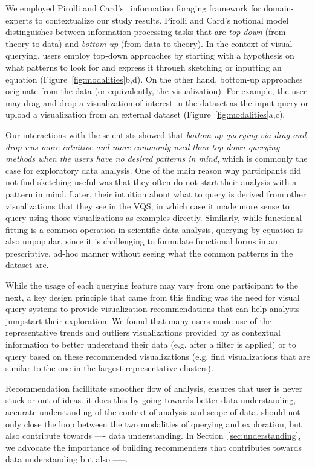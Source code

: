 We employed Pirolli and Card's~\cite{Pirolli} information foraging framework for domain-experts to contextualize our study results. Pirolli and Card's notional model distinguishes between information processing tasks that are \textit{top-down} (from theory to data) and \textit{bottom-up} (from data to theory). In the context of visual querying, users employ top-down approaches by starting with a hypothesis on what patterns to look for and express it through sketching or inputting an equation (Figure~\ref{fig:modalities}b,d). On the other hand, bottom-up approaches originate from the data (or equivalently, the visualization). For example, the user may drag and drop a visualization of interest in the dataset as the input query or upload a visualization from an external dataset (Figure~\ref{fig:modalities}a,c). 
\par Our interactions with the scientists showed that \emph{bottom-up querying via drag-and-drop was more intuitive and more commonly used than top-down querying methods when the users have no desired patterns in mind}, which is commonly the case for exploratory data analysis. One of the main reason why participants did not find sketching useful was that they often do not start their analysis with a pattern in mind. Later, their intuition about what to query is derived from other visualizations that they see in the VQS, in which case it made more sense to query using those visualizations as examples directly. Similarly, while functional fitting is a common operation in scientific data analysis, querying by equation is also unpopular, since it is challenging to formulate functional forms in an prescriptive, ad-hoc manner without seeing what the common patterns in the dataset are. 
\par While the usage of each querying feature may vary from one participant to the next, a key design principle that came from this finding was the need for visual query systems to provide visualization recommendations that can help analysts jumpstart their exploration. We found that many users made use of the representative trends and outliers visualizations provided by \zv as contextual information to better understand their data (e.g. after a filter is applied) or to query based on these recommended visualizations (e.g. find visualizations that are similar to the one in the largest representative clusters). 
\par Recommendation facillitate smoother flow of analysis, ensures that user is never stuck or out of ideas. it does this by going towards better data understanding, accurate understanding of the context of analysis and scope of data. should not only close the loop between the two modalities of querying and exploration, but also contribute towards ---- data understanding. In Section~\ref{sec:understanding}, we advocate the importance of building recommenders that contributes towards data understanding but also -----. 


